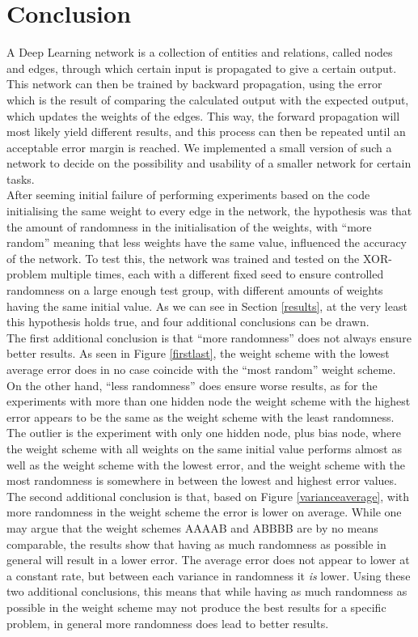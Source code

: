 \documentclass[a4paper, 10pt, notitlepage, twocolumn]{article}
\begin{document}
 \section{Conclusion}
 \label{conclusion}
  A Deep Learning network is a collection of entities and relations, called nodes and edges, through which certain input is propagated to give a certain output. This network can then be trained by backward propagation, using the error which is the result of comparing the calculated output with the expected output, which updates the weights of the edges. This way, the forward propagation will most likely yield different results, and this process can then be repeated until an acceptable error margin is reached. We implemented a small version of such a network to decide on the possibility and usability of a smaller network for certain tasks.\\
	 After seeming initial failure of performing experiments based on the code initialising the same weight to every edge in the network, the hypothesis was that the amount of randomness in the initialisation of the weights, with ``more random'' meaning that less weights have the same value, influenced the accuracy of the network. To test this, the network was trained and tested on the XOR-problem multiple times, each with a different fixed seed to ensure controlled randomness on a large enough test group, with different amounts of weights having the same initial value. As we can see in Section \ref{results}, at the very least this hypothesis holds true, and four additional conclusions can be drawn.\\
	 The first additional conclusion is that ``more randomness'' does not always ensure better results. As seen in Figure \ref{firstlast}, the weight scheme with the lowest average error does in no case coincide with the ``most random'' weight scheme. On the other hand, ``less randomness'' does ensure worse results, as for the experiments with more than one hidden node the weight scheme with the highest error appears to be the same as the weight scheme with the least randomness. The outlier is the experiment with only one hidden node, plus bias node, where the weight scheme with all weights on the same initial value performs almost as well as the weight scheme with the lowest error, and the weight scheme with the most randomness is somewhere in between the lowest and highest error values.\\
	 The second additional conclusion is that, based on Figure \ref{varianceaverage}, with more randomness in the weight scheme the error is lower on average. While one may argue that the weight schemes AAAAB and ABBBB are by no means comparable, the results show that having as much randomness as possible in general will result in a lower error. The average error does not appear to lower at a constant rate, but between each variance in randomness it \emph{is} lower. Using these two additional conclusions, this means that while having as much randomness as possible in the weight scheme may not produce the best results for a specific problem, in general more randomness does lead to better results.\\
\end{document}
